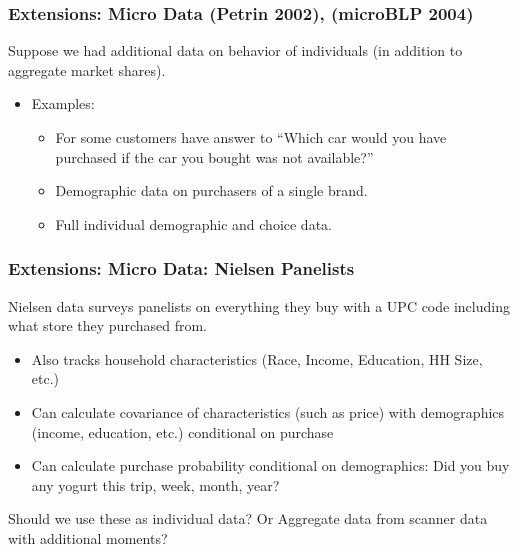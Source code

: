 \documentclass[aspectratio=169,11pt]{beamer}
\begin{document}
\begin{frame}
\frametitle{Extensions: Micro Data (Petrin 2002), (microBLP 2004)}
Suppose we had additional data on behavior of individuals (in addition to aggregate market shares).
\begin{itemize}
\item Examples:
\begin{itemize}
\item For some customers have answer to ``Which car would you have purchased if the car you bought was not available?''
\item Demographic data on purchasers of a single brand.
\item Full individual demographic and choice data.
\end{itemize}
\end{itemize}
\end{frame}

\begin{frame}
\frametitle{Extensions: Micro Data: Nielsen Panelists}
Nielsen data surveys panelists on everything they buy with a UPC code including what store they purchased from.
\begin{itemize}
\item Also tracks household characteristics (Race, Income, Education, HH Size, etc.)
\item Can calculate covariance of characteristics (such as price) with demographics (income, education, etc.) \alert{conditional on purchase}
\item Can calculate purchase probability conditional on demographics: Did you buy any yogurt this trip, week, month, year?
\end{itemize}
Should we use these as individual data? Or Aggregate data from scanner data with additional moments?
\end{frame}
\end{document}
